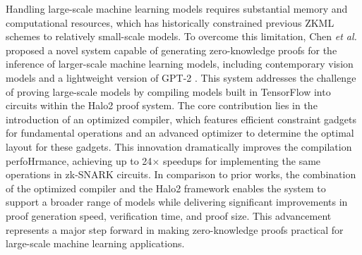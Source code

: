 \documentclass[journal]{IEEEtran}
\begin{document}
Handling large-scale machine learning models requires substantial memory and computational resources, which has historically constrained previous ZKML schemes to relatively small-scale models. To overcome this limitation, Chen \emph{et al.} proposed a novel system capable of generating zero-knowledge proofs for the inference of larger-scale machine learning models, including contemporary vision models and a lightweight version of GPT-2 \cite{chen2024zkml}. This system addresses the challenge of proving large-scale models by compiling models built in TensorFlow into circuits within the Halo2 proof system. The core contribution lies in the introduction of an optimized compiler, which features efficient constraint gadgets for fundamental operations and an advanced optimizer to determine the optimal layout for these gadgets. This innovation dramatically improves the compilation perfoHrmance, achieving up to 24\(\times\) speedups for implementing the same operations in zk-SNARK circuits. In comparison to prior works, the combination of the optimized compiler and the Halo2 framework enables the system to support a broader range of models while delivering significant improvements in proof generation speed, verification time, and proof size. This advancement represents a major step forward in making zero-knowledge proofs practical for large-scale machine learning applications.
\end{document}
